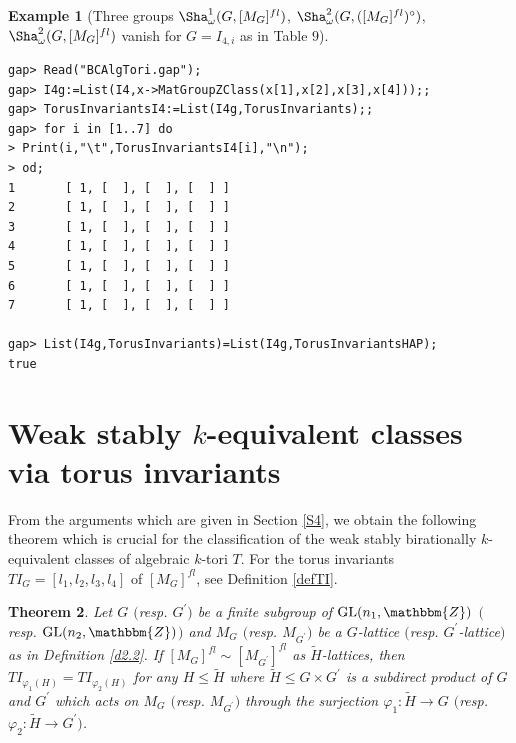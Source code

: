 \documentclass{amsart}
\theoremstyle{plain}
\newtheorem{theorem}{Theorem}[section]
\theoremstyle{definition}
\newtheorem{example}[theorem]{Example}
\theoremstyle{remark}
\newcommand{\bZ}{\mathbbm{Z}}\newcommand{\bQ}{\mathbbm{Q}}
\newcommand{\GL}{{\rm GL}}\newcommand{\SL}{{\rm SL}}
\newcounter{sub}\def\tr{\mbox{tr }}
\begin{document}
\bigskip
\begin{example}[{Three groups $\Sha^1_\omega(G,[M_G]^{fl})$, $\Sha^2_\omega(G,([M_G]^{fl})^\circ)$, $\Sha^2_\omega(G,[M_G]^{fl})$ vanish for $G=I_{4,i}$ as in Table $9$}]\label{exTI-I4}~\vspace*{-5mm}\\
\begin{verbatim}
gap> Read("BCAlgTori.gap");
gap> I4g:=List(I4,x->MatGroupZClass(x[1],x[2],x[3],x[4]));;
gap> TorusInvariantsI4:=List(I4g,TorusInvariants);;
gap> for i in [1..7] do
> Print(i,"\t",TorusInvariantsI4[i],"\n");
> od;
1       [ 1, [  ], [  ], [  ] ]
2       [ 1, [  ], [  ], [  ] ]
3       [ 1, [  ], [  ], [  ] ]
4       [ 1, [  ], [  ], [  ] ]
5       [ 1, [  ], [  ], [  ] ]
6       [ 1, [  ], [  ], [  ] ]
7       [ 1, [  ], [  ], [  ] ]

gap> List(I4g,TorusInvariants)=List(I4g,TorusInvariantsHAP);
true
\end{verbatim}
\end{example}



\section{Weak stably $k$-equivalent classes via torus invariants}\label{S5}

From the arguments which are given in Section \ref{S4}, 
we obtain the following theorem which is crucial for 
the classification of 
the weak stably birationally $k$-equivalent classes 
of algebraic $k$-tori $T$. %
For the torus invariants $TI_G=[l_1,l_2,l_3,l_4]$ of $[M_G]^{fl}$, 
see Definition \ref{defTI}. 


\begin{theorem}\label{th5.1}
Let $G$ $($resp. $G^\prime$$)$ be a finite subgroup of 
$\GL(n_1,\bZ)$ $($resp. $\GL(n_2,\bZ)$$)$ and 
$M_{G}$ $($resp. $M_{G^\prime}$$)$ be a $G$-lattice 
$($resp. $G^\prime$-lattice$)$ as in Definition \ref{d2.2}. 
If $[M_G]^{fl}\sim [M_{G^\prime}]^{fl}$ as $\widetilde{H}$-lattices, 
then $TI_{\varphi_1(H)}=TI_{\varphi_2(H)}$ 
for any $H\leq \widetilde{H}$ 
where $\widetilde{H}\leq G\times G^\prime$ 
is a subdirect product of $G$ and $G^\prime$ 
which acts on $M_G$ 
$($resp. $M_{G^\prime}$$)$ 
through the surjection $\varphi_1: \widetilde{H} \rightarrow G$ 
$($resp. $\varphi_2: \widetilde{H} \rightarrow G^\prime$$)$. 
\end{theorem}
\end{document}
